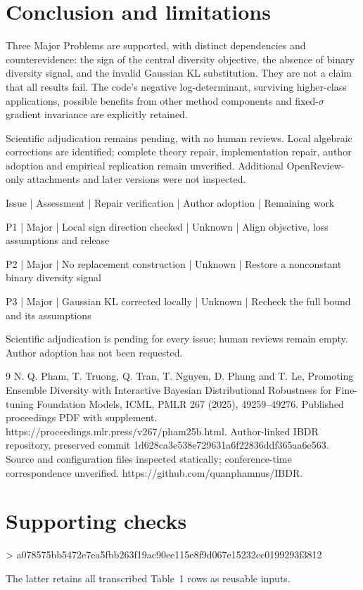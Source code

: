 \documentclass[10pt]{article}
\begin{document}
\section*{Conclusion and limitations}
Three Major Problems are supported, with distinct dependencies and counterevidence: the sign of the central diversity objective, the absence of binary diversity signal, and the invalid Gaussian KL substitution. They are not a claim that all results fail. The code’s negative log-determinant, surviving higher-class applications, possible benefits from other method components and fixed-\(\sigma\) gradient invariance are explicitly retained.\par
Scientific adjudication remains pending, with no human reviews. Local algebraic corrections are identified; complete theory repair, implementation repair, author adoption and empirical replication remain unverified. Additional OpenReview-only attachments and later versions were not inspected.\par
Issue | Assessment | Repair verification | Author adoption | Remaining work\par
P1 | Major | Local sign direction checked | Unknown | Align objective, loss assumptions and release\par
P2 | Major | No replacement construction | Unknown | Restore a nonconstant binary diversity signal\par
P3 | Major | Gaussian KL corrected locally | Unknown | Recheck the full bound and its assumptions\par
Scientific adjudication is pending for every issue; human reviews remain empty. Author adoption has not been requested.\par
9 N. Q. Pham, T. Truong, Q. Tran, T. Nguyen, D. Phung and T. Le, Promoting Ensemble Diversity with Interactive Bayesian Distributional Robustness for Fine-tuning Foundation Models, ICML, PMLR 267 (2025), 49259–49276. Published proceedings PDF with supplement. https://proceedings.mlr.press/v267/pham25b.html. Author-linked IBDR repository, preserved commit 1d628ca3e538e729631a6f22836ddf365aa6e563. Source and configuration files inspected statically; conference-time correspondence unverified. https://github.com/quanphamnus/IBDR.\par
\section*{Supporting checks}
> a078575bb5472e7ea5fbb263f19ac90ee115e8f9d067e15232cc0199293f3812\par
The latter retains all transcribed Table 1 rows as reusable inputs.\par
\end{document}
